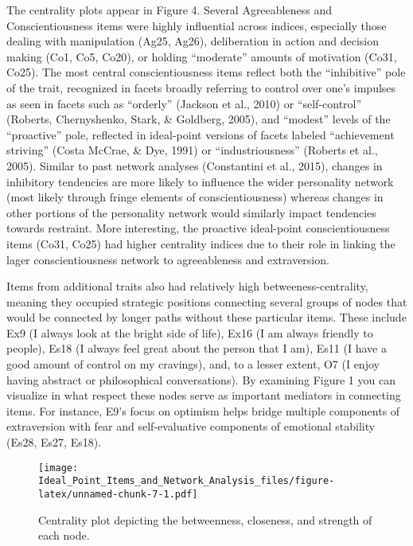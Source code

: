 \documentclass[english,man]{apa6}
\theoremstyle{definition}
\theoremstyle{definition}
\theoremstyle{remark}
\begin{document}
The centrality plots appear in Figure 4. Several Agreeableness and
Conscientiousness items were highly influential across indices,
especially those dealing with manipulation (Ag25, Ag26), deliberation in
action and decision making (Co1, Co5, Co20), or holding
\enquote{moderate} amounts of motivation (Co31, Co25). The most central
conscientiousness items reflect both the \enquote{inhibitive} pole of
the trait, recognized in facets broadly referring to control over one's
impulses as seen in facets such as \enquote{orderly} (Jackson et al.,
2010) or \enquote{self-control} (Roberts, Chernyshenko, Stark, \&
Goldberg, 2005), and \enquote{modest} levels of the \enquote{proactive}
pole, reflected in ideal-point versions of facets labeled
\enquote{achievement striving} (Costa McCrae, \& Dye, 1991) or
\enquote{industriousness} (Roberts et al., 2005). Similar to past
network analyses (Constantini et al., 2015), changes in inhibitory
tendencies are more likely to influence the wider personality network
(most likely through fringe elements of conscientiousness) whereas
changes in other portions of the personality network would similarly
impact tendencies towards restraint. More interesting, the proactive
ideal-point conscientiousness items (Co31, Co25) had higher centrality
indices due to their role in linking the lager conscientiousness network
to agreeableness and extraversion.

Items from additional traits also had relatively high
betweeness-centrality, meaning they occupied strategic positions
connecting several groups of nodes that would be connected by longer
paths without these particular items. These include Ex9 (I always look
at the bright side of life), Ex16 (I am always friendly to people), Es18
(I always feel great about the person that I am), Es11 (I have a good
amount of control on my cravings), and, to a lesser extent, O7 (I enjoy
having abstract or philosophical conversations). By examining Figure 1
you can visualize in what respect these nodes serve as important
mediators in connecting items. For instance, E9's focus on optimism
helps bridge multiple components of extraversion with fear and
self-evaluative components of emotional stability (Es28, Es27, Es18).

\begin{figure}[htbp]
\centering
\texttt{[image: Ideal\_Point\_Items\_and\_Network\_Analysis\_files/figure-latex/unnamed-chunk-7-1.pdf]}
\caption{\label{fig:unnamed-chunk-7}Centrality plot depicting the
betweenness, closeness, and strength of each node.}
\end{figure}
\end{document}
